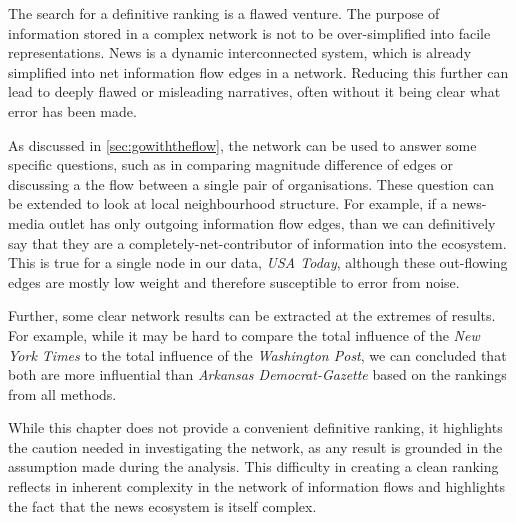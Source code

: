 The search for a definitive ranking is a flawed venture. The purpose of information stored in a complex network is not to be over-simplified into facile representations. News is a dynamic interconnected system, which is already simplified into net information flow edges in a network. Reducing this further can lead to deeply flawed or misleading narratives, often without it being clear what error has been made. 

As discussed in \autoref{sec:gowiththeflow}, the network can be used to answer some specific questions, such as in comparing magnitude difference of edges or discussing a the flow between a single pair of organisations. These question can be extended to look at local neighbourhood structure. For example, if a news-media outlet has only outgoing information flow edges, than we can definitively say that they are a completely-net-contributor of information into the ecosystem. This is true for a single node in our data, \emph{USA Today}, although these out-flowing edges are mostly low weight and therefore susceptible to error from noise.

Further, some clear network results can be extracted at the extremes of results. For example, while it may be hard to compare the total influence of the \emph{New York Times} to the total influence of the \emph{Washington Post}, we can concluded that both are more influential than \emph{Arkansas Democrat-Gazette} based on the rankings from all methods. 

While this chapter does not provide a convenient definitive ranking, it highlights the caution needed in investigating the network, as any result is grounded in the assumption made during the analysis. This difficulty in creating a clean ranking reflects in inherent complexity in the network of information flows and highlights the fact that the news ecosystem is itself complex. 

